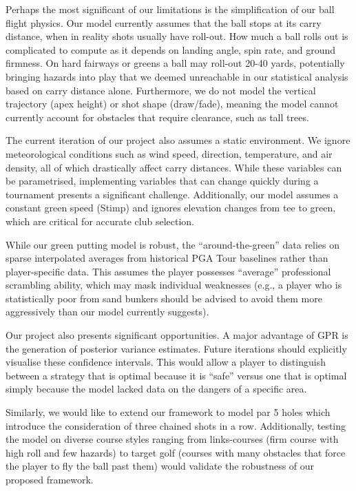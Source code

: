 \documentclass[11pt, letterpaper]{article}
\begin{document}
Perhaps the most significant of our limitations is the simplification of our ball flight physics. Our model currently assumes that the ball stops at its carry distance, when in reality shots usually have roll-out. How much a ball rolls out is complicated to compute as it depends on landing angle, spin rate, and ground firmness. On hard fairways or greens a ball may roll-out 20-40 yards, potentially bringing hazards into play that we deemed unreachable in our statistical analysis based on carry distance alone. Furthermore, we do not model the vertical trajectory (apex height) or shot shape (draw/fade), meaning the model cannot currently account for obstacles that require clearance, such as tall trees.

The current iteration of our project also assumes a static environment. We ignore meteorological conditions such as wind speed, direction, temperature, and air density, all of which drastically affect carry distances. While these variables can be parametrised, implementing variables that can change quickly during a tournament presents a significant challenge. Additionally, our model assumes a constant green speed (Stimp) and ignores elevation changes from tee to green, which are critical for accurate club selection.

While our green putting model is robust, the ``around-the-green'' data relies on sparse interpolated averages from historical PGA Tour baselines rather than player-specific data. This assumes the player possesses ``average'' professional scrambling ability, which may mask individual weaknesses (e.g., a player who is statistically poor from sand bunkers should be advised to avoid them more aggressively than our model currently suggests).

Our project also presents significant opportunities. A major advantage of GPR is the generation of posterior variance estimates. Future iterations should explicitly visualise these confidence intervals. This would allow a player to distinguish between a strategy that is optimal because it is ``safe'' versus one that is optimal simply because the model lacked data on the dangers of a specific area. 

Similarly, we would like to extend our framework to model par 5 holes which introduce the consideration of three chained shots in a row. Additionally, testing the model on diverse course styles ranging from links-courses (firm course with high roll and few hazards) to target golf (courses with many obstacles that force the player to fly the ball past them) would validate the robustness of our proposed framework.
\end{document}
